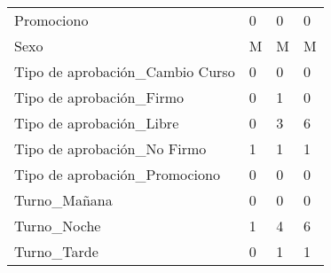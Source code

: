 \begin{longtable}[t]{llll}
\rowcolor{gray!6}  Promociono & 0 & 0 & 0\\
Sexo & M & M & M\\
\rowcolor{gray!6}  Tipo de aprobación\_Cambio Curso & 0 & 0 & 0\\
Tipo de aprobación\_Firmo & 0 & 1 & 0\\
\addlinespace
\rowcolor{gray!6}  Tipo de aprobación\_Libre & 0 & 3 & 6\\
Tipo de aprobación\_No Firmo & 1 & 1 & 1\\
\rowcolor{gray!6}  Tipo de aprobación\_Promociono & 0 & 0 & 0\\
Turno\_Mañana & 0 & 0 & 0\\
\rowcolor{gray!6}  Turno\_Noche & 1 & 4 & 6\\
\addlinespace
Turno\_Tarde & 0 & 1 & 1\\*
\end{longtable}
\endgroup{}
